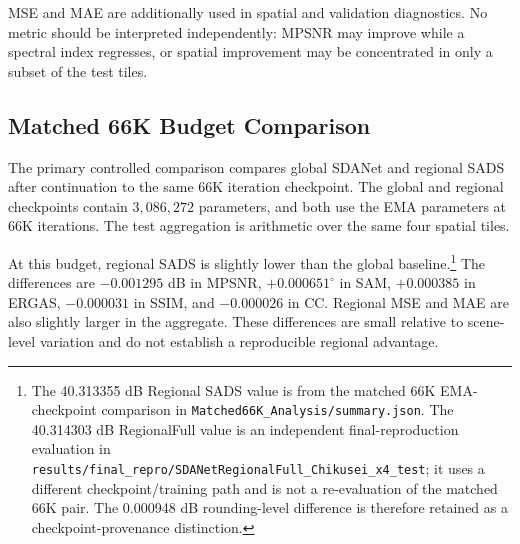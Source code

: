 \documentclass[10pt,twocolumn,letterpaper]{article}
\begin{document}
MSE and MAE are additionally used in spatial and validation diagnostics. No metric should be interpreted independently: MPSNR may improve while a spectral index regresses, or spatial improvement may be concentrated in only a subset of the test tiles.

\subsection{Matched 66K Budget Comparison}

The primary controlled comparison compares global SDANet and regional SADS after continuation to the same 66K iteration checkpoint. The global and regional checkpoints contain $3{,}086{,}272$ parameters, and both use the EMA parameters at 66K iterations. The test aggregation is arithmetic over the same four spatial tiles.

\begin{table}[t]
\centering
\caption{Matched 66K comparison on four Chikusei test tiles. Differences are descriptive and not evidence of statistical significance.}
\label{tab:matched66k}
\small
{}

\end{table}

At this budget, regional SADS is slightly lower than the global baseline.\footnote{The 40.313355 dB Regional SADS value is from the matched 66K EMA-checkpoint comparison in \texttt{Matched66K\_Analysis/summary.json}. The 40.314303 dB RegionalFull value is an independent final-reproduction evaluation in \texttt{results/final\_repro/SDANetRegionalFull\_Chikusei\_x4\_test}; it uses a different checkpoint/training path and is not a re-evaluation of the matched 66K pair. The 0.000948 dB rounding-level difference is therefore retained as a checkpoint-provenance distinction.} The differences are $-0.001295$ dB in MPSNR, $+0.000651^\circ$ in SAM, $+0.000385$ in ERGAS, $-0.000031$ in SSIM, and $-0.000026$ in CC. Regional MSE and MAE are also slightly larger in the aggregate. These differences are small relative to scene-level variation and do not establish a reproducible regional advantage.
\end{document}
